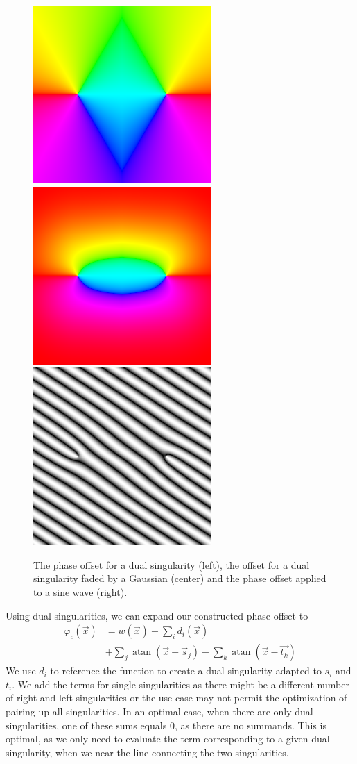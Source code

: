 \documentclass{utue} %
\DeclareMathOperator{\atan}{atan}
\begin{document}
\begin{figure}[ht]
  \centering
  \includegraphics[width=0.32\linewidth]{images/dualSingularityPhase}
  \hfill
  \includegraphics[width=0.32\linewidth]{images/dualSingularityFaded}
  \hfill
  \includegraphics[width=0.32\linewidth]{images/dualSingularitySineWave}
  \caption{The phase offset for a dual singularity (left), the offset for a dual singularity faded by a Gaussian (center) and the phase offset applied to a sine wave (right).}\label{fig:dualSingularity}
\end{figure}

Using dual singularities, we can expand our constructed phase offset to
\begin{align*}
  \varphi_c(\vec{x})&=w(\vec{x}) +\sum_i d_i(\vec{x})\\
  & + \sum_j \atan(\vec{x}-\vec{s}_j) - \sum_k \atan(\vec{x}-\vec{t_k})
\end{align*}
We use $d_i$ to reference the function to create a dual singularity adapted to $s_i$ and $t_i$. We add the terms for single singularities as there might be a different number of right and left singularities or the use case may not permit the optimization of pairing up all singularities. In an optimal case, when there are only dual singularities, one of these sums equals $0$, as there are no summands. This is optimal, as we only need to evaluate the term corresponding to a given dual singularity, when we near the line connecting the two singularities.
\end{document}
